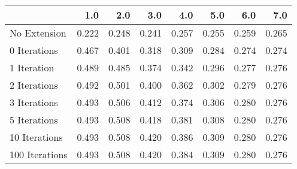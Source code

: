 \begin{tabular}{lrrrrrrr}
\toprule
{} &   1.0 &   2.0 &   3.0 &   4.0 &   5.0 &   6.0 &   7.0 \\
\midrule
No Extension   & 0.222 & 0.248 & 0.241 & 0.257 & 0.255 & 0.259 & 0.265 \\
0 Iterations   & 0.467 & 0.401 & 0.318 & 0.309 & 0.284 & 0.274 & 0.274 \\
1 Iteration    & 0.489 & 0.485 & 0.374 & 0.342 & 0.296 & 0.277 & 0.276 \\
2 Iterations   & 0.492 & 0.501 & 0.400 & 0.362 & 0.302 & 0.279 & 0.276 \\
3 Iterations   & 0.493 & 0.506 & 0.412 & 0.374 & 0.306 & 0.280 & 0.276 \\
5 Iterations   & 0.493 & 0.508 & 0.418 & 0.381 & 0.308 & 0.280 & 0.276 \\
10 Iterations  & 0.493 & 0.508 & 0.420 & 0.386 & 0.309 & 0.280 & 0.276 \\
100 Iterations & 0.493 & 0.508 & 0.420 & 0.384 & 0.309 & 0.280 & 0.276 \\
\bottomrule
\end{tabular}
